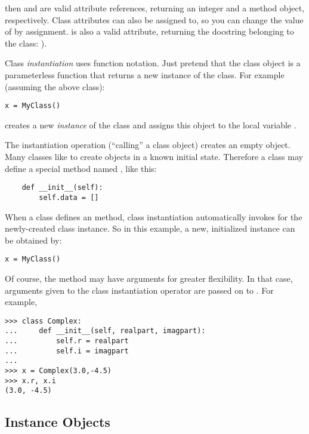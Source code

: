\documentclass{manual}
\begin{document}
then  and  are valid attribute
references, returning an integer and a method object, respectively.
Class attributes can also be assigned to, so you can change the value
of  by assignment.   is also a valid
attribute, returning the docstring belonging to the class: ). 

Class \emph{instantiation} uses function notation.  Just pretend that
the class object is a parameterless function that returns a new
instance of the class.  For example (assuming the above class):

\begin{verbatim}
x = MyClass()
\end{verbatim}

creates a new \emph{instance} of the class and assigns this object to
the local variable .

The instantiation operation (``calling'' a class object) creates an
empty object.  Many classes like to create objects in a known initial
state.  Therefore a class may define a special method named
, like this:

\begin{verbatim}
    def __init__(self):
        self.data = []
\end{verbatim}

When a class defines an  method, class
instantiation automatically invokes  for the
newly-created class instance.  So in this example, a new, initialized
instance can be obtained by:

\begin{verbatim}
x = MyClass()
\end{verbatim}

Of course, the  method may have arguments for
greater flexibility.  In that case, arguments given to the class
instantiation operator are passed on to .  For
example,

\begin{verbatim}
>>> class Complex:
...     def __init__(self, realpart, imagpart):
...         self.r = realpart
...         self.i = imagpart
... 
>>> x = Complex(3.0,-4.5)
>>> x.r, x.i
(3.0, -4.5)
\end{verbatim}


\subsection{Instance Objects \label{instanceObjects}}
\end{document}
